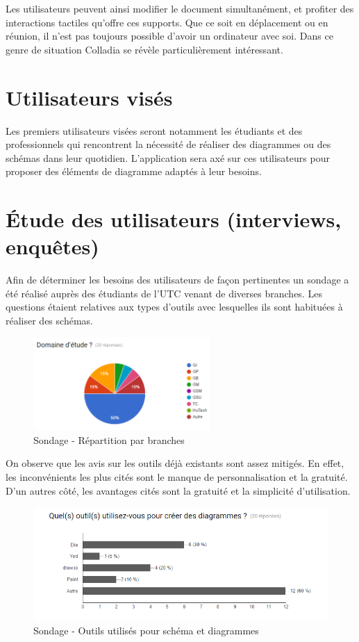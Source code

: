 \documentclass[a4paper,11pt]{article}
\begin{document}
Les utilisateurs peuvent ainsi modifier le document simultanément, et profiter des interactions tactiles qu'offre ces supports.
Que ce soit en déplacement ou en réunion, il n'est pas toujours possible d'avoir un ordinateur avec soi. Dans ce genre de situation Colladia se révèle particulièrement intéressant.
 

\section{Utilisateurs visés}
Les premiers utilisateurs visées seront notamment les étudiants et des professionnels qui rencontrent la nécessité de réaliser des diagrammes ou des schémas dans leur quotidien.
L'application sera axé sur ces utilisateurs pour proposer des éléments de diagramme adaptés à leur besoins.






\section{Étude des utilisateurs (interviews, enquêtes)}

Afin de déterminer les besoins des utilisateurs de façon pertinentes un sondage a été réalisé auprès des étudiants de l’UTC venant de diverses branches. Les questions étaient relatives aux types d'outils avec lesquelles ils sont habituées à réaliser des schémas. 


\begin{figure}[!h]
	\centering
	\includegraphics[width=0.6\textwidth]{img/sondage_branche}
	\caption{Sondage - Répartition par branches}
\end{figure}

On observe que les avis sur les outils déjà existants sont assez mitigés. En effet, les inconvénients les plus cités sont le manque de personnalisation et la gratuité. D'un autres côté, les avantages cités sont la gratuité et la simplicité d'utilisation. 

\begin{figure}[!h]
	\centering
	\includegraphics[width=\textwidth]{img/sondage_outils}
	\caption{Sondage - Outils utilisés pour schéma et diagrammes}
\end{figure}
\end{document}
